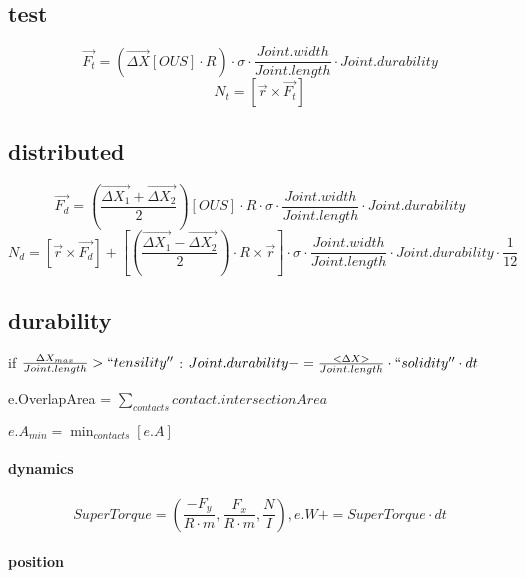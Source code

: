 \subsection{test}
\begin{equation}
 \vec{F_t} = (\vec{\Delta X}[OUS] \cdot R) \cdot \sigma \cdot \frac{Joint.width}{Joint.length} \cdot Joint.durability 
\end{equation}
\begin{equation}
 N_t = [\vec{r} \times \vec{F_t}]
\end{equation}

\subsection{distributed}
\begin{equation}
 \vec{F_d} = (\frac{\vec{\Delta X_1}+\vec{\Delta X_2}}{2})[OUS] \cdot R \cdot \sigma \cdot \frac{Joint.width}{Joint.length} \cdot Joint.durability
\end{equation}
\begin{equation}
 N_d = [\vec{r} \times \vec{F_d}] + [(\frac{\vec{\Delta X_1}-\vec{\Delta X_2}}{2}) \cdot R \times \vec{r}] \cdot \sigma \cdot
 \frac{Joint.width}{Joint.length} \cdot Joint.durability \cdot \frac{1}{12}
\end{equation}

\subsection{durability}
 if $\frac{\Delta X_{max}}{Joint.length} > ``tensility''$ : $Joint.durability -= \frac{<\Delta X>}{Joint.length} \cdot ``solidity'' \cdot dt$
 
 e.OverlapArea = $\sum_{contacts} contact.intersectionArea$
 
 $e.A_{min} = \min_{contacts} [e.A]$
 
 \paragraph{dynamics}
 
\begin{equation}
SuperTorque = ( \frac{-F_y}{R \cdot m}, \frac{F_x}{R \cdot m}, \frac{N}{I}),
e.W += SuperTorque \cdot dt
\end{equation}

\paragraph{position}

